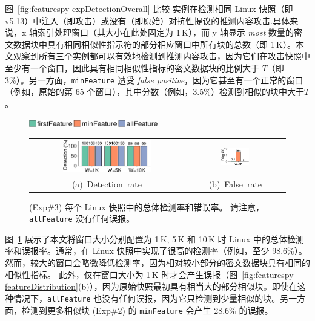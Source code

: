   图~\ref{fig:featurespy-expDetectionOverall} 比较 \sysnameF 实例在检测相同 Linux 快照（即 v5.13）中注入（即攻击）或没有（即原始）对抗性提议的推测内容攻击.具体来说，x 轴索引处理窗口（其大小在此处固定为 1\,K），而 y 轴显示 {\em most} 数量的密文数据块中具有相同相似性指示符的部分相应窗口中所有块的总数（即 1\,K）。本文观察到所有三个实例都可以有效地检测到推测内容攻击，因为它们在攻击快照中至少有一个窗口，因此具有相同相似性指标的密文数据块的比例大于 $T $（即 3\%）。另一方面，{\tt minFeature} 遭受 {\em false positive}，因为它甚至有一个正常的窗口（例如，原始的第 65 个窗口），其中分数（例如，3.5\%）检测到相似的块中大于$T$。


\begin{figure}[!htb]
    \centering
    \includegraphics[width=0.5\textwidth]{pic/featurespy/plot/detection/overall/effectiveness-falsePositive_legend.pdf}
    \vspace{5pt}\\
    \begin{tabular}{@{\ }c@{\ }c}
        \includegraphics[width=0.6\textwidth]{pic/featurespy/plot/detection/overall/effectivenessLinux.pdf} &
        \includegraphics[width=0.3\textwidth]{pic/featurespy/plot/detection/overall/falsePositiveLinux.pdf}\\
        \mbox{\small (a) Detection rate} &
        \mbox{\small (b) False rate}\\
    \end{tabular}
    \vspace{-6pt}
    \caption{(Exp\#3) 每个 Linux 快照中的总体检测率和错误率。 请注意，{\tt allFeature} 没有任何误报。}
    \vspace{-6pt}
    \label{fig:featurespy-expDetectionOverallFalsePositive}
\end{figure}

图~\ref{fig:featurespy-expDetectionOverallFalsePositive} 展示了本文将窗口大小分别配置为 1\,K, 5\,K 和 10\,K 时 Linux 中的总体检测率和误报率。通常，\sysnameF 在 Linux 快照中实现了很高的检测率（例如，至少 98.6\%）。然而，较大的窗口会略微降低检测率，因为相对较小部分的密文数据块具有相同的相似性指标。
此外，\sysnameF 仅在窗口大小为 1\,K 时才会产生误报（图~\ref{fig:featurespy-featureDistribution}(b)），因为原始快照最初具有相当大的部分相似块。即使在这种情况下，{\tt allFeature} 也没有任何误报，因为它只检测到少量相似的块。另一方面，检测到更多相似块 (Exp\#2) 的 {\tt minFeature} 会产生 28.6\% 的误报。


